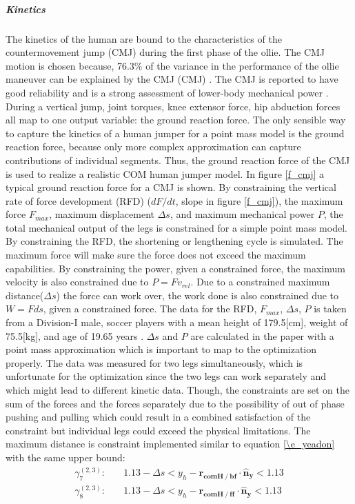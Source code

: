 \subparagraph{Kinetics}
\noindent The kinetics of the human are bound to the characteristics of the countermovement jump (CMJ) during the first phase of the ollie. The CMJ motion is chosen because, 76.3\% of the variance in the performance of the ollie maneuver can be explained by the CMJ (CMJ) \cite{candotti_lower_2012}. The CMJ is reported to have good reliability and is a strong assessment of lower-body mechanical power \cite{barker_relationships_2018}. During a vertical jump, joint torques, knee extensor force, hip abduction forces all map to one output variable: the ground reaction force. The only sensible way to capture the kinetics of a human jumper for a point mass model is the ground reaction force, because only more complex approximation can capture contributions of individual segments. Thus, the ground reaction force of the CMJ is used to realize a realistic COM human jumper model. In figure \ref{f_cmj} a typical ground reaction force for a CMJ is shown. By constraining the vertical rate of force development (RFD) ($dF/dt$, slope in figure \ref{f_cmj}), the maximum force $F_{max}$, maximum displacement $\Delta s$, and maximum mechanical power $P$, the total mechanical output of the legs is constrained for a simple point mass model. By constraining the RFD, the shortening or lengthening cycle is simulated. The maximum force will make sure the force does not exceed the maximum capabilities. By constraining the power, given a constrained force, the maximum velocity is also constrained due to $P = F v_{rel}$.
Due to a constrained maximum distance($\Delta s$) the force can work over, the work done is also constrained due to $W = F ds$, given a constrained force. The data for the RFD, $F_{max}$, $\Delta s$, $P$ is taken from a Division-I male, soccer players with a mean height of 179.5[cm], weight of 75.5[kg], and age of 19.65 years \cite{barker_relationships_2018}. $\Delta s$ and $P$ are calculated in the paper with a point mass approximation which is important to map to the optimization properly. The data was measured for two legs simultaneously, which is unfortunate for the optimization since the two legs can work separately and which might lead to different kinetic data. Though, the constraints are set on the sum of the forces and the forces separately due to the possibility of out of phase pushing and pulling which could result in a combined satisfaction of the constraint but individual legs could exceed the physical limitations. The maximum distance is constraint implemented similar to equation \ref{\e_yeadon} with the same upper bound:
\vspace{-0.1in}
\begin{equation}
\begin{split}
        \gamma_{7}^{(2,3)}:& \quad  1.13-\Delta s < y_h - \mathbf{r_{comH \mathbin{/} bf}} \cdot \mathbf{\hat n_y} < 1.13 \\ 
      \gamma_{8}^{(2,3)}:& \quad  1.13-\Delta s < y_h - \mathbf{r_{comH \mathbin{/} ff}} \cdot \mathbf{\hat n_y} < 1.13 
      \end{split}
\end{equation}


